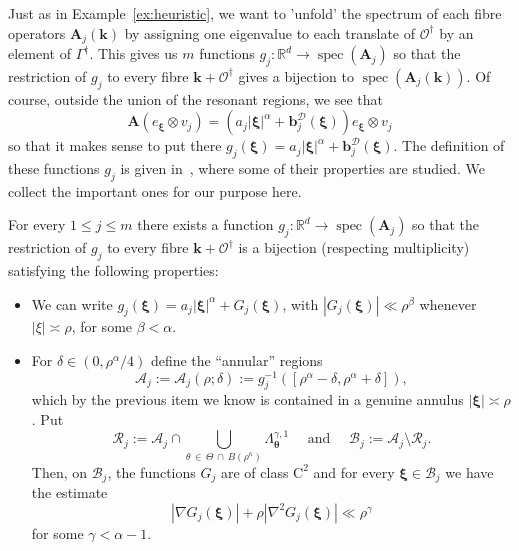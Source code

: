 \documentclass[AHL,Unicode,longabstracts,published]{cedram}
\DeclareMathOperator{\spec}{spec}
\newcommand{\RC}{\mathrm{C}}
\newcommand{\R}{\mathbb R}
\newcommand{\CA}{\mathcal{A}}
\newcommand{\CB}{\mathcal{B}}
\newcommand{\CD}{\mathcal{D}}
\newcommand{\CO}{\mathcal{O}}
\newcommand{\CR}{\mathcal{R}}
\newcommand{\btheta}{\boldsymbol \theta}
\newcommand{\bxi}{\boldsymbol \xi}
\newcommand{\BA}{\mathbf A}
\newcommand{\bbb}{\mathbf b}
\newcommand{\bk}{\mathbf k}
\newcommand{\abs}[1]{\left\lvert #1 \right\rvert}
\begin{document}
Just as in Example~\ref{ex:heuristic}, we want to 'unfold' the spectrum of each fibre operators $\BA_j(\bk)$ by assigning one eigenvalue to each translate of $\CO^\dagger$ by an element of $\Gamma^\dagger$. This gives us $m$ functions $g_j : \R^d \to \spec(\BA_j)$ so that the restriction of $g_j$ to every fibre $\bk + \CO^\dagger$ gives a bijection to $\spec(\BA_j(\bk))$. Of course, outside the union of the resonant regions, we see that
\begin{equation}
\BA (e_{\bxi} \otimes v_j) = \left(a_j \abs \bxi^\alpha + \bbb_j^\CD(\bxi)\right) e_{\bxi} \otimes v_j
\end{equation}
so that it makes sense to put there $g_j(\bxi) = a_j \abs \bxi^\alpha +
\bbb_j^\CD(\bxi)$. The definition of these functions $g_j$ is given in~\cite[Section~7]{ParSob2010}, where some of their properties are studied. We collect the important ones for our purpose here.

\begin{lemm}\label{lem:descriptiongj}
For every $1 \le j \le m$ there exists a function $g_j : \R^d \to
\spec(\BA_j)$ so that the restriction of $g_j$ to every fibre $\bk +
\CO^\dagger$ is a bijection (respecting multiplicity) satisfying the following properties:
\begin{itemize}
\item We can write $g_j(\bxi) = a_j \abs \bxi^\alpha + G_j(\bxi)$, with $\abs{G_j(\bxi)} \ll \rho^\beta$ whenever $\abs \xi \asymp \rho$, for some $\beta < \alpha$.
\item For $\delta \in (0,\rho^\alpha/4)$ define the ``annular'' regions
\begin{equation}
\CA_j := \CA_j(\rho;\delta) := g_j^{-1}\left([\rho^\alpha - \delta,
\rho^\alpha + \delta]\right),
\end{equation}
which by the previous item we know is contained in a genuine annulus $\abs \bxi \asymp \rho$. Put
\begin{equation}
\CR_j := \CA_j \cap \bigcup_{\theta\,\in \,\Theta\,\cap\,B(\rho^\kappa)} \Lambda_{\btheta}^{\gamma,1} \quad \text{ and }
\quad
\CB_j := \CA_j \setminus \CR_j.
\end{equation}
Then, on $\CB_j$, the functions $G_j$ are of class $\RC^2$ and for every $\bxi \in \CB_j$ we have the estimate
\begin{equation}
\abs{\nabla G_j(\bxi)} + \rho \abs{\nabla^2 G_j(\bxi)} \ll
\rho^\gamma
\end{equation}
for some $\gamma< \alpha - 1$.
\end{itemize}
\end{lemm}
\end{document}
